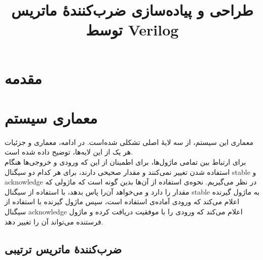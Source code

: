 \documentclass[conference]{IEEEtran-ModifiedForMVIP}
\begin{document}
\IEEEoverridecommandlockouts 

\title{
طراحی و پیاده‌سازی ضرب‌کنندهٔ ماتریس توسط Verilog
}

\author{
}

\maketitle
\begin{abstract}
\end{abstract}
\begin{IEEEkeywords}
\end{IEEEkeywords}


\section{مقدمه}


\section{معماری سیستم}

معماری این سیستم، از سه لایهٔ اصلی تشکلی شده‌است. در ادامه، معماری و جزئیات هر یک از این لایه‌ها، توضیح داده شده است.
\\
برای ارتباط بین تمامی ماژول‌ها، برای اطمینان از این که ورودی و خروجی‌ها هنگام استفاده شدن تغییر نمی‌کنند و مقدار صحیحی دارند، برای هر کدام دو سیگنال stable و acknowledge در نظر می‌گیریم.
نحوه‌ی استفاده از آن‌ها بدین گونه است که ماژولی که مقدار را دارد و می‌خواهد آن‌را پاس بدهد، با استفاده از سیگنال stable به ماژول گیرنده اعلام می‌کند که ورودی آماده‌ی استفاده است،
 سپس ماژول گیرنده با استفاده از سیگنال acknowledge اعلام می‌کند که ورودی را با موفقیت دریافت کرده و ماژول فرستنده می‌تواند آن را تغییر دهد.

\subsection{
    ضرب‌کنندهٔ ماتریس ترتیبی
}
\end{document}
